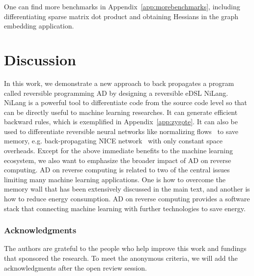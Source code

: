 \documentclass{article}
\newcommand{\<}{\langle}
\renewcommand{\>}{\rangle}
\renewcommand{\cite}[1]{{\citep{#1}}}
\newcommand{\App}[1]{Appendix~\ref{#1}}
\theoremstyle{definition}\newtheorem{definition}{\textit{Definition}}
\begin{document}
One can find more benchmarks in \App{app:morebenchmarks}, including differentiating sparse matrix dot product and obtaining Hessians in the graph embedding application.

\section{Discussion}
In this work, we demonstrate a new approach to back propagates a program called reversible programming AD by designing a reversible eDSL NiLang.
NiLang is a powerful tool to differentiate code from the source code level so that can be directly useful to machine learning researches. It can generate efficient backward rules, which is exemplified in \App{app:zygote}.
It can also be used to differentiate reversible neural networks like normalizing flows~\cite{Kobyzev2019} to save memory, e.g. back-propagating NICE network~\cite{Dinh2014} with only constant space overheads.
Except for the above immediate benefits to the machine learning ecosystem, we also want to emphasize the broader impact of AD on reverse computing.
AD on reverse computing is related to two of the central issues limiting many machine learning applications. One is how to overcome the memory wall that has been extensively discussed in the main text, and another is how to reduce energy consumption.
AD on reverse computing provides a software stack that connecting machine learning with further technologies to save energy.

\subsubsection*{Acknowledgments}
The authors are grateful to the people who help improve this work and fundings that sponsored the research. To meet the anonymous criteria, we will add the acknowledgments after the open review session.
\end{document}
